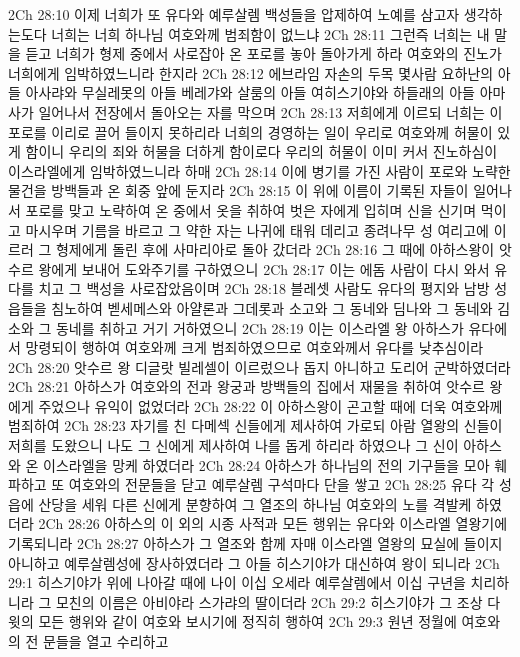 2Ch 28:10  이제 너희가 또 유다와 예루살렘 백성들을 압제하여 노예를 삼고자 생각하는도다 너희는 너희 하나님 여호와께 범죄함이 없느냐
2Ch 28:11  그런즉 너희는 내 말을 듣고 너희가 형제 중에서 사로잡아 온 포로를 놓아 돌아가게 하라 여호와의 진노가 너희에게 임박하였느니라 한지라
2Ch 28:12  에브라임 자손의 두목 몇사람 요하난의 아들 아사랴와 무실레못의 아들 베레갸와 살룸의 아들 여히스기야와 하들래의 아들 아마사가 일어나서 전장에서 돌아오는 자를 막으며
2Ch 28:13  저희에게 이르되 너희는 이 포로를 이리로 끌어 들이지 못하리라 너희의 경영하는 일이 우리로 여호와께 허물이 있게 함이니 우리의 죄와 허물을 더하게 함이로다 우리의 허물이 이미 커서 진노하심이 이스라엘에게 임박하였느니라 하매
2Ch 28:14  이에 병기를 가진 사람이 포로와 노략한 물건을 방백들과 온 회중 앞에 둔지라
2Ch 28:15  이 위에 이름이 기록된 자들이 일어나서 포로를 맞고 노략하여 온 중에서 옷을 취하여 벗은 자에게 입히며 신을 신기며 먹이고 마시우며 기름을 바르고 그 약한 자는 나귀에 태워 데리고 종려나무 성 여리고에 이르러 그 형제에게 돌린 후에 사마리아로 돌아 갔더라
2Ch 28:16  그 때에 아하스왕이 앗수르 왕에게 보내어 도와주기를 구하였으니
2Ch 28:17  이는 에돔 사람이 다시 와서 유다를 치고 그 백성을 사로잡았음이며
2Ch 28:18  블레셋 사람도 유다의 평지와 남방 성읍들을 침노하여 벧세메스와 아얄론과 그데롯과 소고와 그 동네와 딤나와 그 동네와 김소와 그 동네를 취하고 거기 거하였으니
2Ch 28:19  이는 이스라엘 왕 아하스가 유다에서 망령되이 행하여 여호와께 크게 범죄하였으므로 여호와께서 유다를 낮추심이라
2Ch 28:20  앗수르 왕 디글랏 빌레셀이 이르렀으나 돕지 아니하고 도리어 군박하였더라
2Ch 28:21  아하스가 여호와의 전과 왕궁과 방백들의 집에서 재물을 취하여 앗수르 왕에게 주었으나 유익이 없었더라
2Ch 28:22  이 아하스왕이 곤고할 때에 더욱 여호와께 범죄하여
2Ch 28:23  자기를 친 다메섹 신들에게 제사하여 가로되 아람 열왕의 신들이 저희를 도왔으니 나도 그 신에게 제사하여 나를 돕게 하리라 하였으나 그 신이 아하스와 온 이스라엘을 망케 하였더라
2Ch 28:24  아하스가 하나님의 전의 기구들을 모아 훼파하고 또 여호와의 전문들을 닫고 예루살렘 구석마다 단을 쌓고
2Ch 28:25  유다 각 성읍에 산당을 세워 다른 신에게 분향하여 그 열조의 하나님 여호와의 노를 격발케 하였더라
2Ch 28:26  아하스의 이 외의 시종 사적과 모든 행위는 유다와 이스라엘 열왕기에 기록되니라
2Ch 28:27  아하스가 그 열조와 함께 자매 이스라엘 열왕의 묘실에 들이지 아니하고 예루살렘성에 장사하였더라 그 아들 히스기야가 대신하여 왕이 되니라
2Ch 29:1  히스기야가 위에 나아갈 때에 나이 이십 오세라 예루살렘에서 이십 구년을 치리하니라 그 모친의 이름은 아비야라 스가랴의 딸이더라
2Ch 29:2  히스기야가 그 조상 다윗의 모든 행위와 같이 여호와 보시기에 정직히 행하여
2Ch 29:3  원년 정월에 여호와의 전 문들을 열고 수리하고
